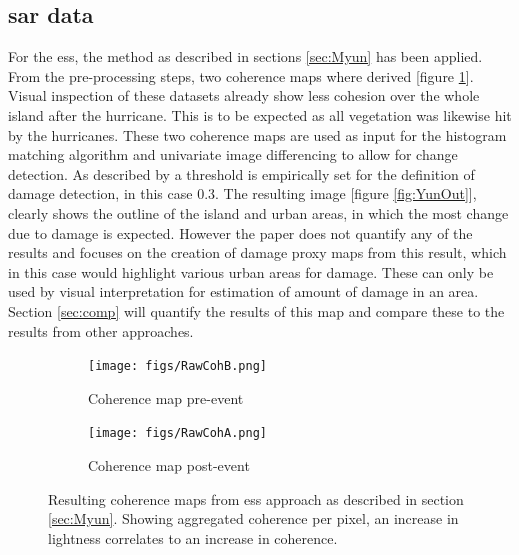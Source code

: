 \subsection{\ac{sar} data}
For the \ac{ess}, the method as described in sections \ref{sec:Myun} has been applied. From the pre-processing steps, two coherence maps where derived [figure \ref{fig:cohm}]. Visual inspection of these datasets already show less cohesion over the whole island after the hurricane. This is to be expected as all vegetation was likewise hit by the hurricanes. These two coherence maps are used as input for the histogram matching algorithm and univariate image differencing to allow for change detection. As described by \citet{Yun2015} a threshold is empirically set for the definition of damage detection, in this case 0.3. The resulting image [figure \ref{fig:YunOut}], clearly shows the outline of the island and urban areas, in which the most change due to damage is expected. However the paper does not quantify any of the results and focuses on the creation of damage proxy maps from this result, which in this case would highlight various urban areas for damage. These can only be used by visual interpretation for estimation of amount of damage in an area. Section \ref{sec:comp} will quantify the results of this map and compare these to the results from other approaches.

\begin{figure}[!h]
	\centering
	\captionsetup{justification=raggedright,singlelinecheck=false}
	\begin{subfigure}{.475\textwidth}
		\centering
		\texttt{[image: figs/RawCohB.png]}
		\caption{\footnotesize{Coherence map pre-event}}
	\end{subfigure}
	\begin{subfigure}{.475\textwidth}
		\centering
		\texttt{[image: figs/RawCohA.png]}
		\caption{\footnotesize{Coherence map post-event}}
	\end{subfigure}
	\caption{\footnotesize{Resulting coherence maps from \ac{ess} approach as described in section \ref{sec:Myun}. Showing aggregated coherence per pixel, an increase in lightness correlates to an increase in coherence.}}
	\label{fig:cohm}
\end{figure}

